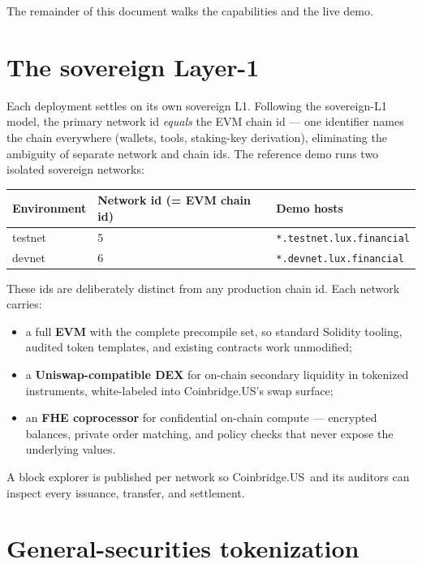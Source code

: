 \documentclass[11pt,a4paper]{article}
\newcommand{\customer}{Coinbridge.US}
\begin{document}
The remainder of this document walks the capabilities and the live demo.

\section{The sovereign Layer-1}

Each deployment settles on its own sovereign L1. Following the
sovereign-L1 model, the primary network id \emph{equals} the EVM chain id
--- one identifier names the chain everywhere (wallets, tools,
staking-key derivation), eliminating the ambiguity of separate network
and chain ids. The reference demo runs two isolated sovereign networks:

\begin{center}
\begin{tabular}{lll}
\toprule
Environment & Network id (= EVM chain id) & Demo hosts \\
\midrule
testnet & 5 & \texttt{*.testnet.lux.financial} \\
devnet  & 6 & \texttt{*.devnet.lux.financial} \\
\bottomrule
\end{tabular}
\end{center}

These ids are deliberately distinct from any production chain id. Each
network carries:

\begin{itemize}[leftmargin=*]
  \item a full \textbf{EVM} with the complete precompile set, so standard
  Solidity tooling, audited token templates, and existing contracts work
  unmodified;
  \item a \textbf{Uniswap-compatible DEX} for on-chain secondary
  liquidity in tokenized instruments, white-labeled into \customer's swap
  surface;
  \item an \textbf{FHE coprocessor} for confidential on-chain compute ---
  encrypted balances, private order matching, and policy checks that never
  expose the underlying values.
\end{itemize}

A block explorer is published per network so \customer\ and its auditors
can inspect every issuance, transfer, and settlement.

\section{General-securities tokenization}
\end{document}
